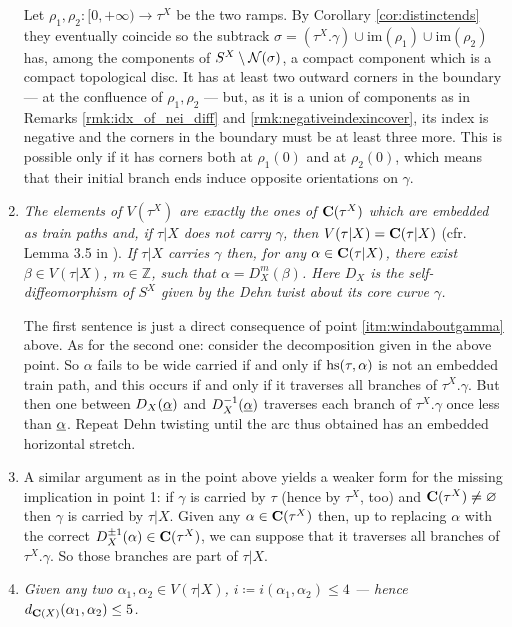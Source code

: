 \begin{rmk}
\begin{enumerate}
Let $\rho_1,\rho_2:[0,+\infty)\rightarrow \tau^X$ be the two ramps. By Corollary \ref{cor:distinctends} they eventually coincide so the subtrack $\sigma=(\tau^X.\gamma)\cup\mathrm{im}(\rho_1)\cup\mathrm{im}(\rho_2)$ has, among the components of $S^X\setminus{\mathcal N}(\sigma)$, a compact component which is a compact topological disc. It has at least two outward corners in the boundary --- at the confluence of $\rho_1,\rho_2$ --- but, as it is a union of components as in Remarks \ref{rmk:idx_of_nei_diff} and \ref{rmk:negativeindexincover}, its index is negative and the corners in the boundary must be at least three more. This is possible only if it has corners both at $\rho_1(0)$ and at $\rho_2(0)$, which means that their initial branch ends induce opposite orientations on $\gamma$.

\item \textit{The elements of $V(\tau^X)$ are exactly the ones of $\mathbf C(\tau^X)$ which are embedded as train paths and, if $\tau|X$ does not carry $\gamma$, then $V(\tau|X)=\mathbf C(\tau|X)$} (cfr. Lemma 3.5 in \cite{mms}). \textit{If $\tau|X$ carries $\gamma$ then, for any $\alpha\in\mathbf C(\tau|X)$, there exist $\beta\in V(\tau|X)$, $m\in\mathbb Z$, such that $\alpha=D_X^m(\beta)$. Here $D_X$ is the self-diffeomorphism \emph{of $S^X$} given by the Dehn twist about its core curve $\gamma$.}

The first sentence is just a direct consequence of point \ref{itm:windaboutgamma} above. As for the second one: consider the decomposition given in the above point. So $\alpha$ fails to be wide carried if and only if $\mathrm{hs}(\tau,\alpha)$ is not an embedded train path, and this occurs if and only if it traverses all branches of $\tau^X.\gamma$. But then one between $D_X(\underline{\alpha})$ and $D_X^{-1}(\underline{\alpha})$ traverses each branch of $\tau^X.\gamma$ once less than $\underline{\alpha}$. Repeat Dehn twisting until the arc thus obtained has an embedded horizontal stretch.

\item \label{itm:gammacarriedininduced} A similar argument as in the point above yields a weaker form for the missing implication in point 1: if $\gamma$ is carried by $\tau$ (hence by $\tau^X$, too) and $\mathbf C(\tau^X)\not=\varnothing$ then $\gamma$ is carried by $\tau|X$. Given any $\alpha\in\mathbf C(\tau^X)$ then, up to replacing $\alpha$ with the correct $D_X^{\pm 1}(\alpha)\in\mathbf C(\tau^X)$, we can suppose that it traverses all branches of $\tau^X.\gamma$. So those branches are part of $\tau|X$.

\item \label{itm:diambound}\textit{Given any two $\alpha_1,\alpha_2\in V(\tau|X)$, $i\coloneqq i(\alpha_1,\alpha_2)\leq 4$ --- hence $d_{\mathbf C(X)}(\alpha_1,\alpha_2)\leq 5$.}


\end{enumerate}
\end{rmk}
